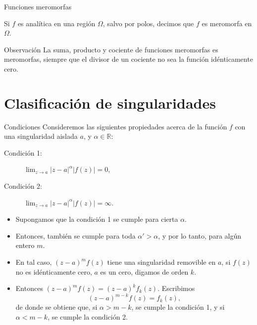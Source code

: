 \documentclass[spanish,presentation]{beamer}
\begin{document}
\begin{frame}[label=sec-1-4]{Funciones meromorfas}
\begin{definition}
Si \(f\) es analítica en una región \(\Omega\), salvo por polos,
decimos que \(f\) es \alert{meromorfa} en \(\Omega\).
\end{definition}

\begin{block}{Observación}
La suma, producto y cociente de funciones meromorfas es
meromorfas, siempre que el divisor de un cociente no sea la
función idénticamente cero. 
\end{block}
\end{frame}

\section{Clasificación de singularidades}
\label{sec-2}

\begin{frame}[label=sec-2-1]{Condiciones}
Consideremos las siguientes propiedades acerca de la función \(f\)
con una singularidad aislada \(a\), y \(\alpha\in \mathbb{R}\):

\begin{description}
\item[{Condición 1:}] \(\lim_{z\to a}|z-a|^{\alpha}|f(z)|=0\),
\item[{Condición 2:}] \(\lim_{z\to a}|z-a|^{\alpha}|f(z)|=\infty\).
\end{description}
\end{frame}

\begin{frame}[label=sec-2-2]{}
\begin{itemize}
\item Supongamos que la condición 1 se cumple para cierta \(\alpha\).
\item Entonces, también se cumple para toda \(\alpha'>\alpha\), y por
lo tanto, para algún entero \(m\).
\item En tal caso, \((z-a)^{m}f(z)\) tiene una singularidad removible
en \(a\), si \(f(z)\) no es idénticamente cero, \(a\) es un cero,
digamos de orden \(k\).
\item Entonces \((z-a)^{m}f(z)=(z-a)^{k}f_{k}(z)\). Escribimos
\begin{displaymath}
(z-a)^{m-k}f(z)=f_{k}(z),
\end{displaymath}
de donde se obtiene que, si \(\alpha>m-k\), se cumple la condición
1, y si \(\alpha<m-k\), se cumple la condición 2.
\end{itemize}
\end{frame}
\end{document}

